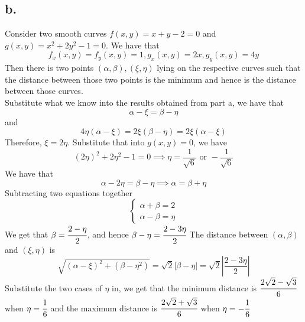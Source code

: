 \documentclass[11pt]{article}
\begin{document}
\subsection*{b.}
Consider two smooth curves $f(x,y) = x + y - 2 = 0$ and $g(x,y) = x^2+2y^2-1=0$.
We have that
\[
    f_x(x,y) = f_y(x,y) = 1, g_x(x,y) = 2x, g_y(x,y) = 4y    
\]
Then there is two points $(\alpha,\beta), (\xi,\eta)$ lying on the respective curves such that 
the distance between those two points is the minimum and hence is the distance between those curves. \\
Substitute what we know into the results obtained from part a, we have that
\[
    \alpha-\xi = \beta - \eta     
\] 
and 
\[
    4\eta (\alpha-\xi) = 2\xi (\beta-\eta) = 2\xi(\alpha-\xi)    
\]
Therefore, $\xi = 2\eta$. Substitute that into $g(x,y) = 0$, we have
\[
    (2\eta)^2 + 2\eta^2 - 1 = 0 \implies \eta = \frac{1}{\sqrt{6}} \text{ or } -\frac{1}{\sqrt{6}}
\]
We have that 
\[  
    \alpha - 2\eta = \beta - \eta \implies \alpha = \beta + \eta
\]
Subtracting two equations together
\[
    \begin{cases}
        \alpha + \beta = 2 \\
        \alpha - \beta = \eta 
    \end{cases}    
\]
We get that $\beta = \cfrac{2-\eta}{2}$, and hence $\beta - \eta = \cfrac{2-3\eta}{2}$ 
The distance between $(\alpha,\beta)$ and $(\xi,\eta)$ is 
\[
    \sqrt{(\alpha- \xi)^2 + (\beta - \eta^2)} = \sqrt{2}|\beta-\eta| = \sqrt{2}\left|\frac{2-3\eta}{2}\right|
\]
Substitute the two cases of $\eta$ in, we get that 
the minimum distance is $\cfrac{2\sqrt{2} - \sqrt{3}}{6}$ when $\eta = \cfrac{1}{6}$ 
and the maximum distance is $\cfrac{2\sqrt{2} + \sqrt{3}}{6}$ when $\eta = -\cfrac{1}{6}$

\pagebreak
\end{document}
